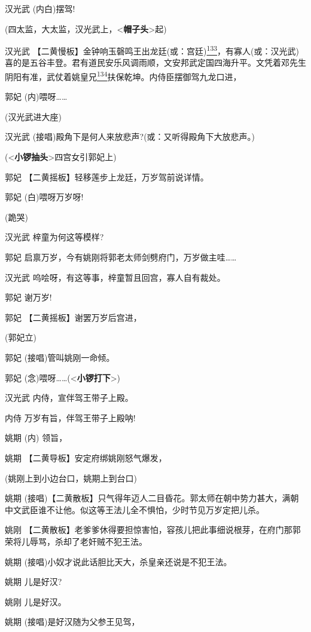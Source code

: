 汉光武 (内白)摆驾!

(四太监，大太监，汉光武上，\textless{}\textbf{帽子头}\textgreater{}起)

汉光武
【二黄慢板】金钟响玉磬鸣王出龙廷(或：宫廷)\protect\hyperlink{fn133}{\textsuperscript{133}}，有寡人(或：汉光武)喜的是五谷丰登。君有道民安乐风调雨顺，文安邦武定国四海升平。文凭着邓先生阴阳有准，武仗着姚皇兄\protect\hyperlink{fn134}{\textsuperscript{134}}扶保乾坤。内侍臣摆御驾九龙口进，

郭妃 (内)喂呀\ldots{}\ldots{}

(汉光武进大座)

汉光武 (接唱)殿角下是何人来放悲声?(或：又听得殿角下大放悲声。)

(\textless{}\textbf{小锣抽头}\textgreater{}四宫女引郭妃上)

郭妃 【二黄摇板】轻移莲步上龙廷，万岁驾前说详情。

郭妃 (白)喂呀万岁呀!

(跪哭)

汉光武 梓童为何这等模样?

郭妃 启禀万岁，今有姚刚将郭老太师剑劈府门，万岁做主哇\ldots{}\ldots{}

汉光武 呜哙呀，有这等事，梓童暂且回宫，寡人自有裁处。

郭妃 谢万岁!

郭妃 【二黄摇板】谢罢万岁后宫进，

(郭妃立)

郭妃 (接唱)管叫姚刚一命倾。

郭妃
(念)喂呀\ldots{}\ldots{}(\textless{}\textbf{小锣打下}\textgreater{})

汉光武 内侍，宣伴驾王带子上殿。

内侍 万岁有旨，伴驾王带子上殿呐!

姚期 (内) 领旨，

姚期 【二黄导板】安定府绑姚刚怒气爆发，

(姚刚上到小边台口，姚期上到台口)

姚期
(接唱)【二黄散板】只气得年迈人二目昏花。郭太师在朝中势力甚大，满朝中文武臣谁不让他。似这等王法儿全不惧怕，少时节见万岁定把儿杀。

姚刚
【二黄散板】老爹爹休得要担惊害怕，容孩儿把此事细说根芽，在府门那郭荣将儿辱骂，杀却了老奸贼不犯王法。

姚期 (接唱)小奴才说此话胆比天大，杀皇亲还说是不犯王法。

姚期 儿是好汉?

姚刚 儿是好汉。

姚期 (接唱)是好汉随为父参王见驾，

